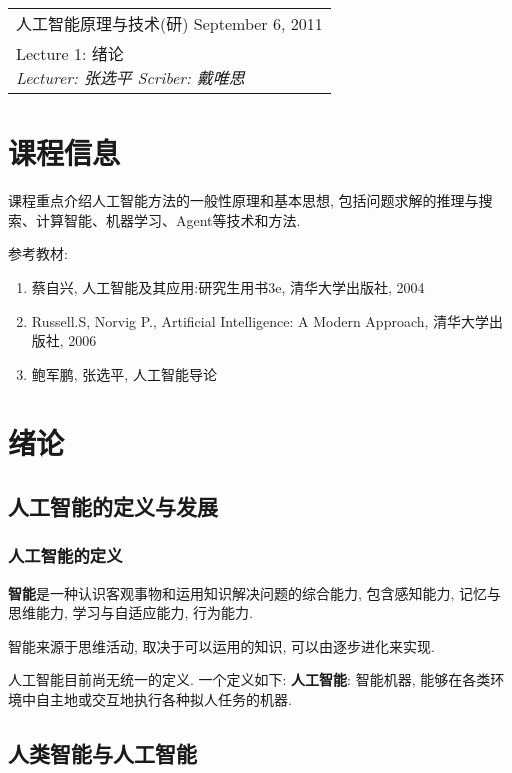 \def\lecture{1}
\clearpage \noindent\begin{tabularx}{\linewidth}{|X|}
\hline \vskip -2mm
{\sf 人工智能原理与技术(研)} \hfill September 6, 2011 \\
{\centering \sf \large Lecture \lecture:
绪论 \\ }
\textsl{Lecturer: 张选平 \hfill Scriber: 戴唯思}\\ \hline
\end{tabularx}
\setcounter{section}{0}
\renewcommand{\thepage}{\lecture -\arabic{page}}

\section{课程信息}

    课程重点介绍人工智能方法的一般性原理和基本思想, 包括问题求解的推理与搜索、计算智能、机器学习、Agent等技术和方法.

    参考教材: 
    
    \begin{enumerate}
        \item 蔡自兴, 人工智能及其应用:研究生用书3e, 清华大学出版社, 2004
        \item Russell.S, Norvig P., Artificial Intelligence: A Modern Approach, 清华大学出版社, 2006
        \item 鲍军鹏, 张选平, 人工智能导论
    \end{enumerate}

\section{绪论}

    \subsection{人工智能的定义与发展}

        \subsubsection{人工智能的定义}

            \textbf{智能}是一种认识客观事物和运用知识解决问题的综合能力, 包含感知能力, 记忆与思维能力, 学习与自适应能力, 行为能力.

            智能来源于思维活动, 取决于可以运用的知识, 可以由逐步进化来实现.

            人工智能目前尚无统一的定义. 一个定义如下: \textbf{人工智能}: 智能机器, 能够在各类环境中自主地或交互地执行各种拟人任务的机器.




    \subsection{人类智能与人工智能}


